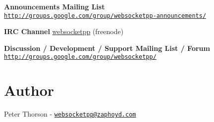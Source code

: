 {\bfseries Announcements Mailing List} \href{http://groups.google.com/group/websocketpp-announcements/}{\tt http\+://groups.\+google.\+com/group/websocketpp-\/announcements/}

{\bfseries I\+RC Channel} \mbox{\hyperlink{namespacewebsocketpp}{websocketpp}} (freenode)

{\bfseries Discussion / Development / Support Mailing List / Forum} \href{http://groups.google.com/group/websocketpp/}{\tt http\+://groups.\+google.\+com/group/websocketpp/}

\section*{Author }

Peter Thorson -\/ \href{mailto:websocketpp@zaphoyd.com}{\tt websocketpp@zaphoyd.\+com} 